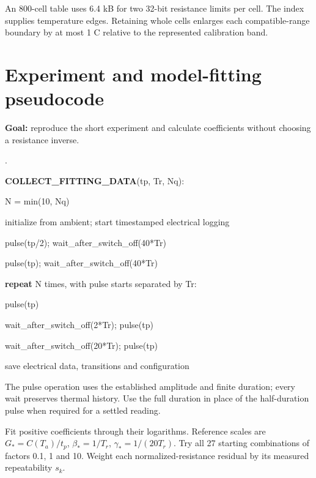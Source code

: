 \documentclass[11pt,letterpaper]{article}
\newcounter{pseudoline}
\newenvironment{pseudocode}{%
  \par\begingroup\small
  \setcounter{pseudoline}{0}
  \begin{list}{\arabic{pseudoline}.}{%
    \usecounter{pseudoline}
    \setlength{\leftmargin}{2.5em}
    \setlength{\labelwidth}{1.9em}
    \setlength{\labelsep}{0.6em}
    \setlength{\itemsep}{0.15em}
    \setlength{\parsep}{0pt}
    \setlength{\topsep}{0.35em}}%
  }{\end{list}\endgroup\par}
\newcommand{\pcstep}[2]{%
  \item \hspace*{#1em}%
  \parbox[t]{\dimexpr\linewidth-#1em\relax}{\raggedright #2\strut}}
\begin{document}
An 800-cell table uses 6.4 kB for two 32-bit resistance limits per cell. The index supplies temperature edges. Retaining whole cells enlarges each compatible-range boundary by at most 1 \textdegree{}C relative to the represented calibration band.

\section{Experiment and model-fitting pseudocode}

\textbf{Goal:} reproduce the short experiment and calculate coefficients without choosing a resistance inverse.

\begin{pseudocode}
\pcstep{0.0}{\textbf{COLLECT\_\allowbreak{}FITTING\_\allowbreak{}DATA}(tp, Tr, Nq):}
\pcstep{1.0}{N = min(10, Nq)}
\pcstep{1.0}{initialize from ambient; start timestamped electrical logging}
\pcstep{1.0}{pulse(tp/2); wait\_\allowbreak{}after\_\allowbreak{}switch\_\allowbreak{}off(40*Tr)}
\pcstep{1.0}{pulse(tp); wait\_\allowbreak{}after\_\allowbreak{}switch\_\allowbreak{}off(40*Tr)}
\pcstep{1.0}{\textbf{repeat} N times, with pulse starts separated by Tr:}
\pcstep{2.0}{pulse(tp)}
\pcstep{1.0}{wait\_\allowbreak{}after\_\allowbreak{}switch\_\allowbreak{}off(2*Tr); pulse(tp)}
\pcstep{1.0}{wait\_\allowbreak{}after\_\allowbreak{}switch\_\allowbreak{}off(20*Tr); pulse(tp)}
\pcstep{1.0}{save electrical data, transitions and configuration}
\end{pseudocode}

The \textsf{pulse} operation uses the established amplitude and finite duration; every wait preserves thermal history. Use the full duration in place of the half-duration pulse when required for a settled reading.

Fit positive coefficients through their logarithms. Reference scales are \(G_*=C(T_a)/t_p\), \(\beta_*=1/T_r\), \(\gamma_*=1/(20T_r)\). Try all 27 starting combinations of factors 0.1, 1 and 10. Weight each normalized-resistance residual by its measured repeatability \(s_k\).
\end{document}
